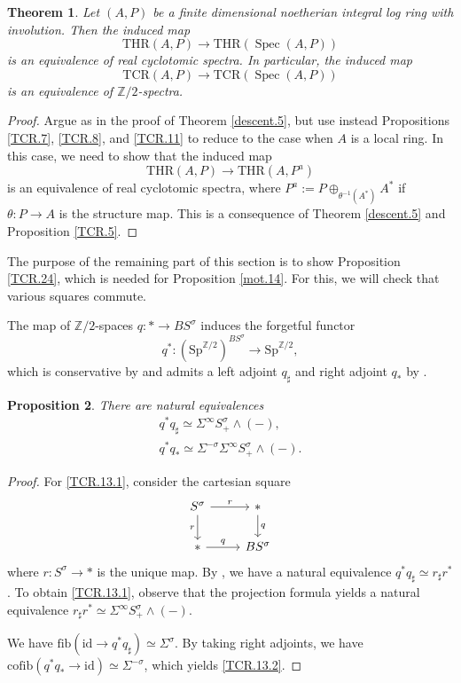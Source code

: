 \documentclass[10pt]{amsart}
\newtheorem{thm}{Theorem}[section]
\newtheorem{prop}[thm]{Proposition}
\theoremstyle{definition}
\theoremstyle{remark}
\numberwithin{equation}{section}
\newcommand{\Z}{\mathbb{Z}}
\DeclareMathOperator{\Spec}{Spec}
\newcommand{\id}{\mathrm{id}}
\newcommand{\cofib}{\mathrm{cofib}}
\newcommand{\fib}{\mathrm{fib}}
\newcommand{\Sp}{\mathrm{Sp}}
\newcommand{\THR}{\mathrm{THR}}
\newcommand{\TCR}{\mathrm{TCR}}
\begin{document}
\begin{thm}
\label{TCR.10}
Let $(A,P)$ be a finite dimensional noetherian integral log ring with involution.
Then the induced map
\[
\THR(A,P)
\to
\THR(\Spec(A,P))
\]
is an equivalence of real cyclotomic spectra.
In particular,
the induced map
\[
\TCR(A,P)
\to
\TCR(\Spec(A,P))
\]
is an equivalence of $\Z/2$-spectra.
\end{thm}
\begin{proof}
Argue as in the proof of Theorem \ref{descent.5},
but use instead Propositions \ref{TCR.7}, \ref{TCR.8}, and \ref{TCR.11} to reduce to the case when $A$ is a local ring.
In this case,
we need to show that the induced map
\[
\THR(A,P)
\to
\THR(A,P^a)
\]
is an equivalence of real cyclotomic spectra,
where $P^a:=P\oplus_{\theta^{-1}(A^*)}A^*$ if $\theta\colon P\to A$ is the structure map.
This is a consequence of Theorem \ref{descent.5} and Proposition \ref{TCR.5}.
\end{proof}

The purpose of the remaining part of this section is to show Proposition \ref{TCR.24},
which is needed for Proposition \ref{mot.14}.
For this,
we will check that various squares commute.

The map of $\Z/2$-spaces $q\colon *\to BS^\sigma$ induces the forgetful functor
\[
q^*\colon (\Sp^{\Z/2})^{BS^\sigma}\to \Sp^{\Z/2},
\]
which is conservative by \cite[Proposition 3.8]{synTCR} and admits a left adjoint $q_\sharp$ and right adjoint $q_*$ by \cite[Proposition 3.7]{synTCR}.


\begin{prop}
\label{TCR.13}
There are natural equivalences
\begin{gather}
\label{TCR.13.1}
q^*q_\sharp\simeq \Sigma^\infty S_+^\sigma \wedge (-),
\\
\label{TCR.13.2}
q^*q_*\simeq \Sigma^{-\sigma} \Sigma^\infty S_+^\sigma \wedge (-).
\end{gather}
\end{prop}
\begin{proof}
For \eqref{TCR.13.1},
consider the cartesian square
\[
\begin{tikzcd}
S^\sigma\ar[d,"r"']\ar[r,"r"]&
*\ar[d,"q"]
\\
*\ar[r,"q"]&
BS^\sigma
\end{tikzcd}
\]
where $r\colon S^\sigma\to *$ is the unique map.
By \cite[Lemma 4.3]{QS1},
we have a natural equivalence $q^*q_\sharp\simeq r_\sharp r^*$.
To obtain \eqref{TCR.13.1},
observe that the projection formula \cite[Lemma 5.44]{QS1} yields a natural equivalence $r_\sharp r^*\simeq \Sigma^\infty S_+^\sigma \wedge (-)$.

We have $\fib(\id \to q^*q_\sharp)\simeq \Sigma^\sigma$.
By taking right adjoints,
we have $\cofib(q^*q_*\to \id)\simeq \Sigma^{-\sigma}$,
which yields \eqref{TCR.13.2}.
\end{proof}
\end{document}
